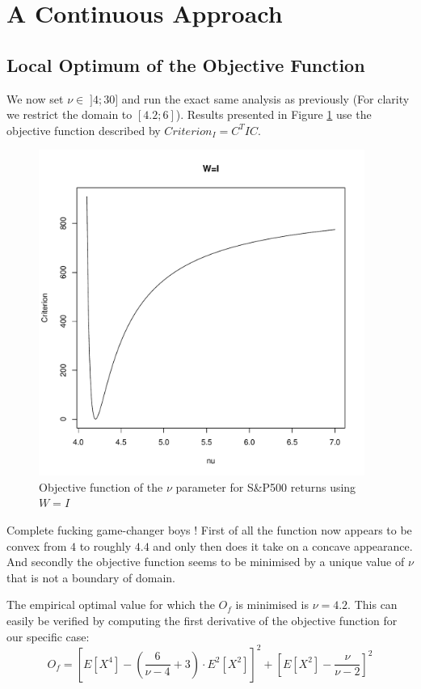 \section{A Continuous Approach}

\subsection{Local Optimum of the Objective Function}

We now set $\nu \in \; ]4;30]$ and run the exact same analysis as previously (For clarity we restrict the domain to $[4.2;6]$). Results presented in Figure \ref{ConcavitySPI} use the objective function described by $Criterion_I = C^T I C$.
\begin{figure}
    \centering
    \includegraphics[width=0.95\textwidth]{ConcavityS&PI.pdf}
    \caption{Objective function of the $\nu$ parameter for S\&P500 returns using $W=I$}
    \label{ConcavitySPI}
\end{figure}
\par
Complete fucking game-changer boys ! First of all the function now appears to be convex from $4$ to roughly $4.4$ and only then does it take on a concave appearance. And secondly the objective function seems to be minimised by a unique value of $\nu$ that is not a boundary of domain.
\par
The empirical optimal value for which the $O_f$ is minimised is $\nu=4.2$. 
This can easily be verified by computing the first derivative of the objective function for our specific case:
\begin{equation}\label{ObjectiveFunction_I}
    O_f = \left[E\left[X^4\right] - \left(\frac{6}{\nu-4}+3\right)\cdot         
                E^2\left[X^2\right]\right]^2 +
            \left[E\left[X^2\right] - \frac{\nu}{\nu - 2}\right]^2
\end{equation}


